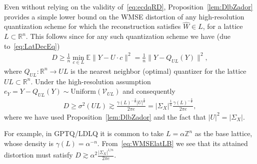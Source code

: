 \documentclass[journal]{IEEEtran}
\newcommand{\ZZ}{\mathbb{Z}}
\newcommand{\RR}{\mathbb{R}}
\newcommand{\Unif}{\mathrm{Uniform}}
\def\EE{\mathbb{E}}
\newcommand{\m}{\mathcal}
\newcommand{\nbyp}[1]{{\color{red}[ \textbf{YP:} #1}]}
\newtheorem{claim}{Claim}
\begin{document}
Even without relying on the validity of~\eqref{eq:ecdqRD}, Proposition~\ref{lem:DlbZador} provides a simple lower bound on the WMSE distortion of any high-resolution quantization scheme for which the reconstruction satisfies $\hat{W}\in L$, for a lattice $L\subset\RR^n$. This follows since for any such quantization scheme we have (due to~\eqref{eq:LatDecEq}) 
\begin{align}
D\geq \frac{1}{n}\min_{c\in L}\EE\|Y-U\cdot c\|^2=\frac{1}{n}\|Y-Q_{UL}(Y)\|^2, \nonumber   
\end{align}
where $Q_{UL}:\RR^n\to UL$ is the nearest neighbor (optimal) quantizer for the lattice $UL\subset\RR^n$. Under the high-resolution assumption $e_Y=Y-Q_{UL}(Y)\sim\Unif(\m{V}_{UL})$ and consequently 
\begin{align}
D\geq \sigma^2(UL)\gtrsim \frac{\gamma(L)^{-\frac{2}{n}}|U|^{\frac{2}{n}}}{2\pi e} = |\Sigma_X|^{\frac{1}{n}} \frac{\gamma(L)^{-\frac{2}{n}}}{2\pi e},
\label{eq:WMSElatLB}
\end{align}
where we have used Proposition~\ref{lem:DlbZador} and the fact that $|U|^2=|\Sigma_X|$.


For example, in GPTQ/LDLQ it is common to take $L=\alpha\ZZ^n$ as the base lattice, whose density is $\gamma(L)=\alpha^{-n}$. From~\eqref{eq:WMSElatLB} we see that its attained distortion must satisfy $D\gtrsim \alpha^2 \frac{|\Sigma_X|^{1/n}}{2\pi e}$. 
\end{document}
